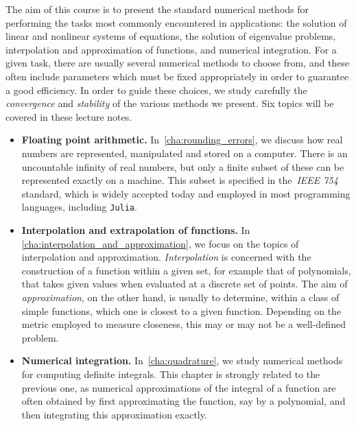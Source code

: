 The aim of this course is to present the standard numerical methods for performing the tasks most commonly encountered in applications:
the solution of linear and nonlinear systems of equations,
the solution of eigenvalue problems,
interpolation and approximation of functions,
and numerical integration.
For a given task,
there are usually several numerical methods to choose from,
and these often include parameters which must be fixed appropriately in order to guarantee a good efficiency.
In order to guide these choices,
we study carefully the \emph{convergence} and \emph{stability} of the various methods we present.
Six topics will be covered in these lecture notes.
\begin{itemize}
    \item
        \textbf{Floating point arithmetic.}
        In~\cref{cha:rounding_errors},
        we discuss how real numbers are represented, manipulated and stored on a computer.
        There is an uncountable infinity of real numbers,
        but only a finite subset of these can be represented exactly on a machine.
        This subset is specified in the~\emph{IEEE 754} standard,
        which is widely accepted today and employed in most programming languages, including \texttt{Julia}.

    \item
        \textbf{Interpolation and extrapolation of functions.}
        In \cref{cha:interpolation_and_approximation},
        we focus on the topics of interpolation and approximation.
        \emph{Interpolation} is concerned with the construction of a function within a given set,
        for example that of polynomials,
        that takes given values when evaluated at a discrete set of points.
        The aim of \emph{approximation}, on the other hand,
        is usually to determine, within a class of simple functions,
        which one is closest to a given function.
        Depending on the metric employed to measure closeness,
        this may or may not be a well-defined problem.

    \item
        \textbf{Numerical integration.}
        In~\cref{cha:quadrature},
        we study numerical methods for computing definite integrals.
        This chapter is strongly related to the previous one,
        as numerical approximations of the integral of a function are often obtained by first approximating the function,
        say by a polynomial, and then integrating this approximation exactly.


\end{itemize}
